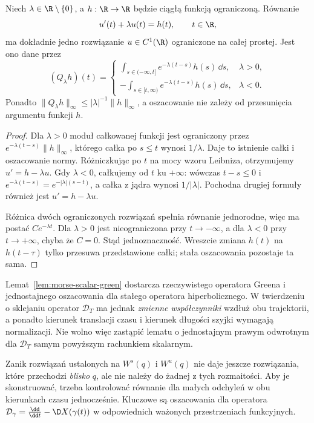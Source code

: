 \begin{lemat}
\label{lem:morse-scalar-green}
Niech $\lambda\in\R\setminus\{0\}$,
a $h:\R\to\R$ będzie ciągłą funkcją ograniczoną.
Równanie
\[
 u'(t)+\lambda u(t)=h(t),\qquad t\in\R,
\]
ma dokładnie jedno rozwiązanie $u\in C^1(\R)$
ograniczone na całej prostej. Jest ono dane przez
\[
 (Q_\lambda h)(t)=
 \begin{cases}
 \displaystyle\int_{s\in(-\infty,t]}
           e^{-\lambda(t-s)}h(s)\,\dd s,&\lambda>0,\\[6pt]
 \displaystyle-\int_{s\in[t,\infty)}
           e^{-\lambda(t-s)}h(s)\,\dd s,&\lambda<0.
 \end{cases}
\]
Ponadto $\|Q_\lambda h\|_\infty
\le|\lambda|^{-1}\|h\|_\infty$, a oszacowanie
nie zależy od przesunięcia argumentu funkcji $h$.
\end{lemat}
\begin{proof}
Dla $\lambda>0$ moduł całkowanej funkcji jest
ograniczony przez $e^{-\lambda(t-s)}\|h\|_\infty$,
którego całka po $s\le t$ wynosi $1/\lambda$.
Daje to istnienie całki i oszacowanie normy.
Różniczkując po $t$ na mocy wzoru Leibniza,
otrzymujemy $u'=h-\lambda u$.
Gdy $\lambda<0$, całkujemy od $t$ ku $+\infty$:
wówczas $t-s\le0$ i
$e^{-\lambda(t-s)}=e^{-|\lambda|(s-t)}$,
a całka z jądra wynosi $1/|\lambda|$.
Pochodna drugiej formuły również jest
$u'=h-\lambda u$.

Różnica dwóch ograniczonych rozwiązań
spełnia równanie jednorodne, więc ma postać
$C e^{-\lambda t}$.
Dla $\lambda>0$ jest nieograniczona
przy $t\to-\infty$, a dla $\lambda<0$
przy $t\to+\infty$, chyba że $C=0$.
Stąd jednoznaczność. Wreszcie zmiana
$h(t)$ na $h(t-\tau)$ tylko przesuwa
przedstawione całki; stała oszacowania
pozostaje ta sama.
\end{proof}

\begin{uwaga}
Lemat~\ref{lem:morse-scalar-green} dostarcza
rzeczywistego operatora Greena i jednostajnego oszacowania
dla stałego operatora hiperbolicznego.
W twierdzeniu o sklejaniu operator
$\mathcal D_T$ ma jednak \emph{zmienne współczynniki}
wzdłuż obu trajektorii, a ponadto
kierunek translacji czasu i kierunek długości
szyjki wymagają normalizacji.
Nie wolno więc zastąpić lematu o jednostajnym
prawym odwrotnym dla $\mathcal D_T$
samym powyższym rachunkiem skalarnym.
\end{uwaga}

\begin{uwaga}
Zanik rozwiązań ustalonych na $W^s(q)$ i $W^u(q)$ nie daje
jeszcze rozwiązania, które przechodzi \emph{blisko} $q$,
ale nie należy do żadnej z tych rozmaitości. Aby je
skonstruować, trzeba kontrolować równanie dla małych
odchyleń w obu kierunkach czasu jednocześnie.
Kluczowe są oszacowania dla operatora
$\mathcal D_\gamma=\tfrac{\dd}{\dd t}-\D X(\gamma(t))$
w odpowiednich ważonych przestrzeniach funkcyjnych.
\end{uwaga}

